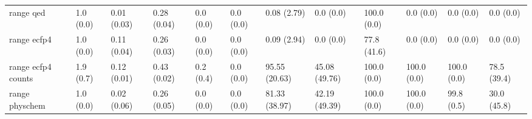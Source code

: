 \begin{tabular}{llllllllllll}
range qed & {\cellcolor[HTML]{F6FCFD}} \color[HTML]{000000} 1.0 (0.0) & {\cellcolor[HTML]{F3FAFC}} \color[HTML]{000000} 0.01 (0.03) & {\cellcolor[HTML]{55B98F}} \color[HTML]{F1F1F1} 0.28 (0.04) & {\cellcolor[HTML]{F7FCFD}} \color[HTML]{000000} 0.0 (0.0) & {\cellcolor[HTML]{F7FCFD}} \color[HTML]{000000} 0.0 (0.0) & {\cellcolor[HTML]{F7FCFD}} \color[HTML]{000000} 0.08 (2.79) & {\cellcolor[HTML]{F7FCFD}} \color[HTML]{000000} 0.0 (0.0) & {\cellcolor[HTML]{A5DDD0}} \color[HTML]{000000} 100.0 (0.0) & {\cellcolor[HTML]{DAF1F1}} \color[HTML]{000000} 0.0 (0.0) & {\cellcolor[HTML]{CDECE7}} \color[HTML]{000000} 0.0 (0.0) & {\cellcolor[HTML]{F7FCFD}} \color[HTML]{000000} 0.0 (0.0) \\
range ecfp4 & {\cellcolor[HTML]{F6FCFD}} \color[HTML]{000000} 1.0 (0.0) & {\cellcolor[HTML]{F7FCFD}} \color[HTML]{000000} 0.11 (0.04) & {\cellcolor[HTML]{74C8AE}} \color[HTML]{000000} 0.26 (0.03) & {\cellcolor[HTML]{F7FCFD}} \color[HTML]{000000} 0.0 (0.0) & {\cellcolor[HTML]{F7FCFD}} \color[HTML]{000000} 0.0 (0.0) & {\cellcolor[HTML]{F7FCFD}} \color[HTML]{000000} 0.09 (2.94) & {\cellcolor[HTML]{F7FCFD}} \color[HTML]{000000} 0.0 (0.0) & {\cellcolor[HTML]{00441B}} \color[HTML]{F1F1F1} 77.8 (41.6) & {\cellcolor[HTML]{F7FCFD}} \color[HTML]{000000} 0.0 (0.0) & {\cellcolor[HTML]{00441B}} \color[HTML]{F1F1F1} 0.0 (0.0) & {\cellcolor[HTML]{00441B}} \color[HTML]{F1F1F1} 0.0 (0.0) \\
range ecfp4 counts & {\cellcolor[HTML]{F5FBFC}} \color[HTML]{000000} 1.9 (0.7) & {\cellcolor[HTML]{F7FCFD}} \color[HTML]{000000} 0.12 (0.01) & {\cellcolor[HTML]{7DCCB5}} \color[HTML]{000000} 0.43 (0.02) & {\cellcolor[HTML]{F7FCFD}} \color[HTML]{000000} 0.2 (0.4) & {\cellcolor[HTML]{F7FCFD}} \color[HTML]{000000} 0.0 (0.0) & {\cellcolor[HTML]{005221}} \color[HTML]{F1F1F1} 95.55 (20.63) & {\cellcolor[HTML]{7ACBB3}} \color[HTML]{000000} 45.08 (49.76) & {\cellcolor[HTML]{00441B}} \color[HTML]{F1F1F1} 100.0 (0.0) & {\cellcolor[HTML]{107A37}} \color[HTML]{F1F1F1} 100.0 (0.0) & {\cellcolor[HTML]{00441B}} \color[HTML]{F1F1F1} 100.0 (0.0) & {\cellcolor[HTML]{00481D}} \color[HTML]{F1F1F1} 78.5 (39.4) \\
range physchem & {\cellcolor[HTML]{F6FCFD}} \color[HTML]{000000} 1.0 (0.0) & {\cellcolor[HTML]{F7FCFD}} \color[HTML]{000000} 0.02 (0.06) & {\cellcolor[HTML]{57BA92}} \color[HTML]{F1F1F1} 0.26 (0.05) & {\cellcolor[HTML]{F7FCFD}} \color[HTML]{000000} 0.0 (0.0) & {\cellcolor[HTML]{F7FCFD}} \color[HTML]{000000} 0.0 (0.0) & {\cellcolor[HTML]{117B38}} \color[HTML]{F1F1F1} 81.33 (38.97) & {\cellcolor[HTML]{85CFBB}} \color[HTML]{000000} 42.19 (49.39) & {\cellcolor[HTML]{00441B}} \color[HTML]{F1F1F1} 100.0 (0.0) & {\cellcolor[HTML]{00441B}} \color[HTML]{F1F1F1} 100.0 (0.0) & {\cellcolor[HTML]{208843}} \color[HTML]{F1F1F1} 99.8 (0.5) & {\cellcolor[HTML]{F7FCFD}} \color[HTML]{000000} 30.0 (45.8) \\

\end{tabular}
